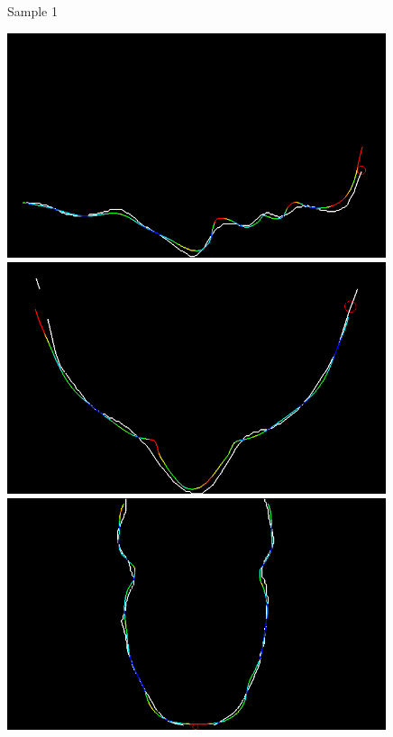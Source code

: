 \begin{figure}
  Sample 1

  \begin{minipage}{.325\textwidth}
    \centering
    \includegraphics[width=0.99\textwidth]{Figures/eval/our/1/x.png}
  \end{minipage}
  \begin{minipage}{.325\textwidth}
    \centering
    \includegraphics[width=0.99\textwidth]{Figures/eval/our/1/y.png}
  \end{minipage}
  \begin{minipage}{.325\textwidth}
    \centering
    \includegraphics[width=0.99\textwidth]{Figures/eval/our/1/z.png}
  \end{minipage}


\end{figure}
